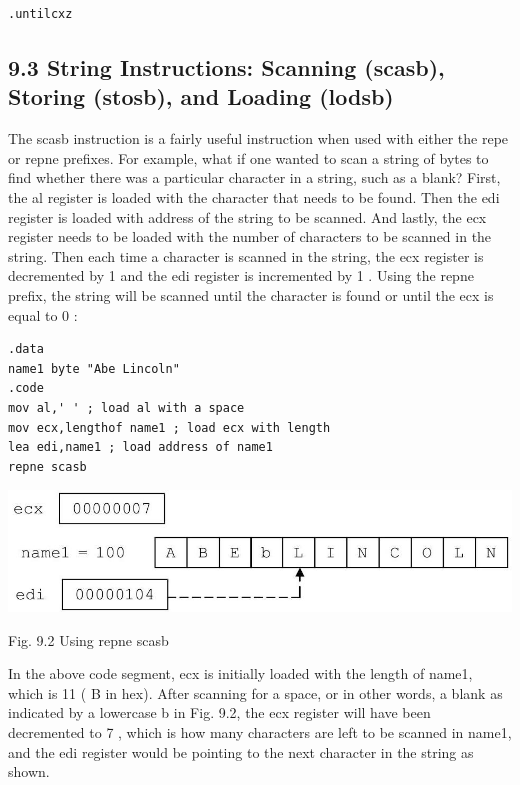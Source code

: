 \documentclass[10pt]{article}
\begin{document}
\begin{verbatim}
.untilcxz
\end{verbatim}

\subsection*{9.3 String Instructions: Scanning (scasb), Storing (stosb), and Loading (lodsb)}
The scasb instruction is a fairly useful instruction when used with either the repe or repne prefixes. For example, what if one wanted to scan a string of bytes to find whether there was a particular character in a string, such as a blank? First, the al register is loaded with the character that needs to be found. Then the edi register is loaded with address of the string to be scanned. And lastly, the ecx register needs to be loaded with the number of characters to be scanned in the string. Then each time a character is scanned in the string, the ecx register is decremented by 1 and the edi register is incremented by 1 . Using the repne prefix, the string will be scanned until the character is found or until the ecx is equal to 0 :

\begin{verbatim}
.data
name1 byte "Abe Lincoln"
.code
mov al,' ' ; load al with a space
mov ecx,lengthof name1 ; load ecx with length
lea edi,name1 ; load address of name1
repne scasb
\end{verbatim}

\begin{center}
\includegraphics[max width=\textwidth]{2025_03_24_ebe50cc223a6fbc49eecg-206}
\end{center}

Fig. 9.2 Using repne scasb

In the above code segment, ecx is initially loaded with the length of name1, which is 11 ( B in hex). After scanning for a space, or in other words, a blank as indicated by a lowercase b in Fig. 9.2, the ecx register will have been decremented to 7 , which is how many characters are left to be scanned in name1, and the edi register would be pointing to the next character in the string as shown.
\end{document}
